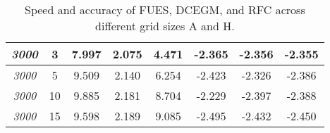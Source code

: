 \begin{table}[htbp]
\begin{tabular}{ccccc|ccc}
\multirow{1}{*}{\textit{3000}} & 3 & 7.997 & 2.075 & 4.471 & -2.365 & -2.356 & -2.355 \\
\midrule
\multirow{1}{*}{\textit{3000}} & 5 & 9.509 & 2.140 & 6.254 & -2.423 & -2.326 & -2.386 \\
\midrule
\multirow{1}{*}{\textit{3000}} & 10 & 9.885 & 2.181 & 8.704 & -2.229 & -2.397 & -2.388 \\
\midrule
\multirow{1}{*}{\textit{3000}} & 15 & 9.598 & 2.189 & 9.085 & -2.495 & -2.432 & -2.450 \\
\bottomrule
\end{tabular}
\caption{\small Speed and accuracy of FUES, DCEGM, and RFC across different grid sizes A and H.}
\end{table}